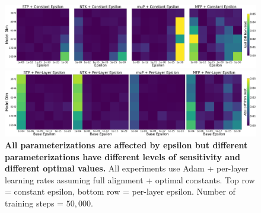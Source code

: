 \begin{figure}[ht]
    \begin{center}
        \includegraphics[width=\linewidth, trim={0, 0, 0, 0},clip]{icml2024/figures/epsilon/appendix_heatmaps/constant_epsilon_heatmaps.png}
       
        \figvspace
       
        \includegraphics[width=\linewidth, trim={0, 0, 0, 0},clip]{icml2024/figures/epsilon/appendix_heatmaps/per_layer_epsilon_heatmaps.png}
       
       
        \caption{\textbf{All parameterizations are affected by epsilon but different parameterizations have different levels of sensitivity and different optimal values.} All experiments use Adam + per-layer learning rates assuming full alignment + optimal constants. Top row = constant epsilon, bottom row = per-layer epsilon. Number of training steps = $50{,}000$.}
        \label{fig:epsilon_appendix_heatmaps}
        \vspace{-24pt}
    \end{center}
\end{figure}


